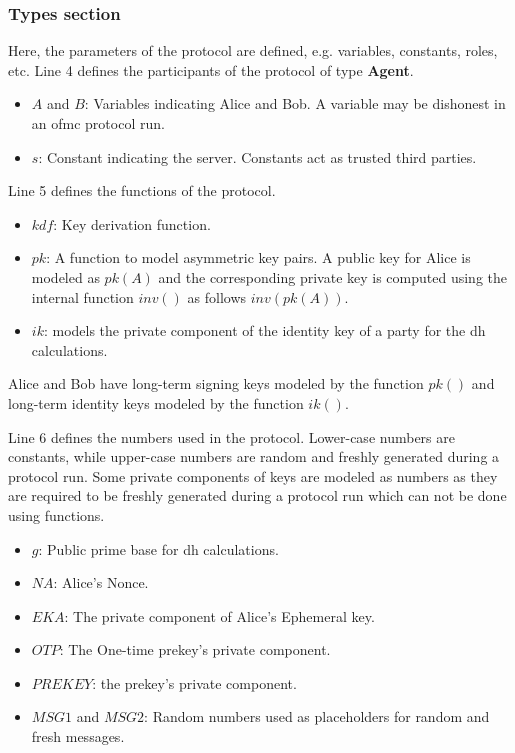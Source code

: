 \subsubsection{Types section} 
Here, the parameters of the protocol are defined, e.g. variables, constants, roles, etc. Line 4 defines the participants of the protocol of type \textbf{Agent}.
\begin{itemize}
	\item $A$ and $B$: Variables indicating Alice and Bob. A variable may be dishonest in an \gls{ofmc} protocol run.
	\item $s$: Constant indicating the server. Constants act as trusted third parties.
\end{itemize}
\par
Line 5 defines the functions of the protocol.
\begin{itemize}
	\item $kdf$: Key derivation function.
	\item $pk$: A function to model asymmetric key pairs. A public key for Alice is modeled as $pk(A)$ and the corresponding private key is computed using the internal function $inv()$ as follows $inv(pk(A))$.
	\item $ik$: models the private component of the identity key of a party for the \gls{dh} calculations.
\end{itemize}
	Alice and Bob have long-term signing keys modeled by the function $pk()$ and long-term identity keys modeled by the function $ik()$.
	\par
Line 6 defines the numbers used in the protocol. Lower-case numbers are constants, while upper-case numbers are random and freshly generated during a protocol run. Some private components of keys are modeled as numbers as they are required to be freshly generated during a protocol run which can not be done using functions.
\begin{itemize}
	\item $g$: Public prime base for \gls{dh} calculations.
	\item $NA$: Alice's Nonce.
	\item $EKA$: The private component of Alice's Ephemeral key.
	\item $OTP$: The One-time prekey's private component.
	\item $PREKEY$: the prekey's private component.
	\item $MSG1$ and $MSG2$: Random numbers used as placeholders for random and fresh messages.
\end{itemize}

